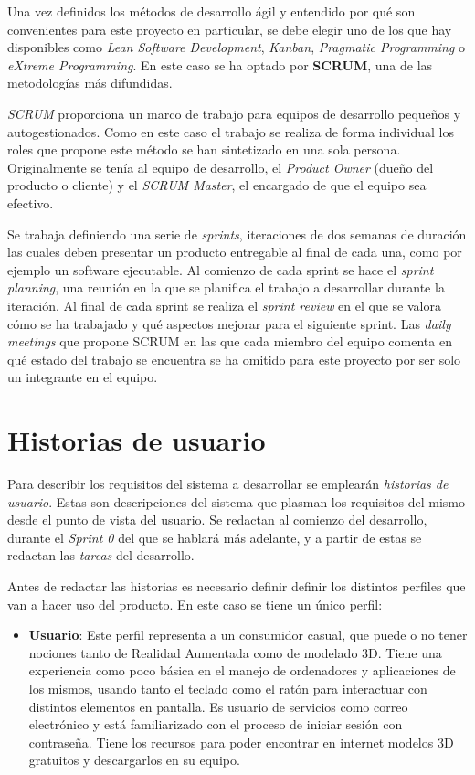 Una vez definidos los métodos de desarrollo ágil y entendido por qué son convenientes para este proyecto en particular, se debe elegir uno de los que hay disponibles como \textit{Lean Software Development}, \textit{Kanban}, \textit{Pragmatic Programming} o \textit{eXtreme Programming}. En este caso se ha optado por \textbf{SCRUM}\cite{scrum}, una de las metodologías más difundidas.

\textit{SCRUM} proporciona un marco de trabajo para equipos de desarrollo pequeños y autogestionados. Como en este caso el trabajo se realiza de forma individual los roles que propone este método se han sintetizado en una sola persona. Originalmente se tenía al equipo de desarrollo, el \textit{Product Owner} (dueño del producto o cliente) y el \textit{SCRUM Master}, el encargado de que el equipo sea efectivo.

Se trabaja definiendo una serie de \textit{sprints}, iteraciones de dos semanas de duración las cuales deben presentar un producto entregable al final de cada una, como por ejemplo un software ejecutable. Al comienzo de cada  sprint se hace el \textit{sprint planning}, una reunión en la que se planifica el trabajo a desarrollar durante la iteración. Al final de cada sprint se realiza el \textit{sprint review} en el que se valora cómo se ha trabajado y qué aspectos mejorar para el siguiente sprint. Las \textit{daily meetings} que propone SCRUM en las que cada miembro del equipo comenta en qué estado del trabajo se encuentra se ha omitido para este proyecto por ser solo un integrante en el equipo.

\section{Historias de usuario}

Para describir los requisitos del sistema a desarrollar se emplearán \textit{historias de usuario}. Estas son descripciones del sistema que plasman los requisitos del mismo desde el punto de vista del usuario. Se redactan al comienzo del desarrollo, durante el \textit{Sprint 0} del que se hablará más adelante, y a partir de estas se redactan las \textit{tareas} del desarrollo.

Antes de redactar las historias es necesario definir definir los distintos perfiles que van a hacer uso del producto. En este caso se tiene un único perfil:

\begin{itemize}
    \item \textbf{Usuario}: Este perfil representa a un consumidor casual, que puede o no tener nociones tanto de Realidad Aumentada como de modelado 3D. Tiene una experiencia como poco básica en el manejo de ordenadores y aplicaciones de los mismos, usando tanto el teclado como el ratón para interactuar con distintos elementos en pantalla. Es usuario de servicios como correo electrónico y está familiarizado con el proceso de iniciar sesión con contraseña. Tiene los recursos para poder encontrar en internet modelos 3D gratuitos y descargarlos en su equipo.
\end{itemize}

